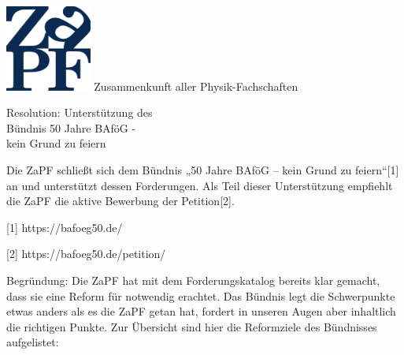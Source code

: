 \documentclass[DIV=calc]{scrartcl}
\newcommand{\zapf}{ZaPF\xspace}
\begin{document}
\hspace{0.87\textwidth}
\begin{minipage}{120pt}
	\vspace{-1.8cm}
	\includegraphics[width=80pt]{../logo.pdf}
	\centering
	\small Zusammenkunft aller Physik-Fachschaften
\end{minipage}

\begin{center}
  \huge{Resolution: Unterstützung des\\ Bündnis 50 Jahre BAföG - \\kein Grund zu feiern}\vspace{.25\baselineskip}\\
  \normalsize
\end{center}
\vspace{1cm}





Die \zapf schließt sich dem Bündnis „50 Jahre BAföG – kein Grund zu feiern“[1] an und unterstützt dessen Forderungen.\newline 
Als Teil dieser Unterstützung empfiehlt die ZaPF die aktive Bewerbung der Petition[2].

[1] https://bafoeg50.de/

[2] https://bafoeg50.de/petition/

\newpage
Begründung:\newline 
Die \zapf hat mit dem Forderungskatalog bereits klar gemacht, dass sie eine Reform für notwendig erachtet. Das Bündnis legt die Schwerpunkte etwas anders als es die ZaPF getan hat, fordert in unseren Augen aber inhaltlich die richtigen Punkte.\newline 
Zur Übersicht sind hier die Reformziele des Bündnisses aufgelistet:
\end{document}

